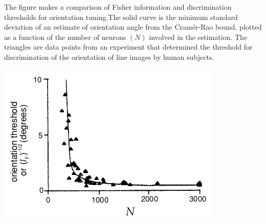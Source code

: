 \begin{exm}
  The figure makes a comparison of Fisher information and discrimination thresholds for
orientation tuning.The solid curve is the minimum standard deviation of an estimate of orientation angle from the Cramér-Rao bound, plotted as a function of the
number of neurons $(N)$ involved in the estimation. The triangles are data points
from an experiment that determined the threshold for discrimination of
the orientation of line images by human subjects.
\begin{center}
   \includegraphics[scale = 0.6]{./png/3-12}
\end{center}
\end{exm}
















